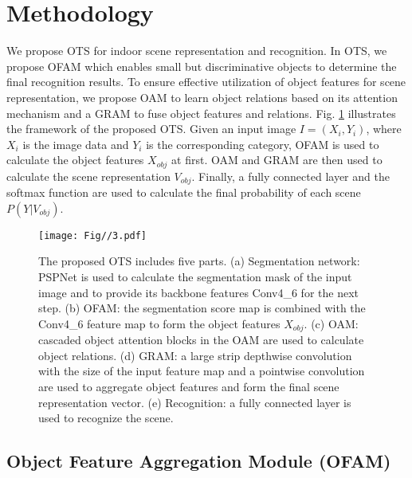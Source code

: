 \documentclass[letterpaper, 10 pt, conference]{ieeeconf}  %
\begin{document}
\vspace{-1mm}

\section{Methodology}
\label{Methodology}

We propose OTS for indoor scene representation and recognition. In OTS, we propose OFAM which enables small but discriminative objects to determine the final recognition results. To ensure effective utilization of object features for scene representation, we propose OAM to learn object relations based on its attention mechanism and a GRAM to fuse object features and relations. Fig. \ref{img3} illustrates the framework of the proposed OTS. Given an input image $I = (X_{i}, Y_{i})$, where $X_{i}$ is the image data and $Y_{i}$ is the corresponding category, OFAM is used to calculate the object features $X_{obj}$ at first. OAM and GRAM are then used to calculate the scene representation $V_{obj}$. Finally, a fully connected layer and the softmax function are used to calculate the final probability of each scene $P(Y|V_{obj})$.


\begin{figure}[t!]
    \centering
    \texttt{[image: Fig//3.pdf]}
    \caption{The proposed OTS includes five parts. (a) Segmentation network: PSPNet is used to calculate the segmentation mask of the input image and to provide its backbone features Conv4\_6 for the next step. (b) OFAM: the segmentation score map is combined with the Conv4\_6 feature map to form the object features $X_{obj}$. (c) OAM: cascaded object attention blocks in the OAM are used to calculate object relations. (d) GRAM: a large strip depthwise convolution with the size of the input feature map and a pointwise convolution are used to aggregate object features and form the final scene representation vector. (e) Recognition: a fully connected layer is used to recognize the scene.}
    \label{img3}
    \vspace{-4mm}
\end{figure}

\subsection{Object Feature Aggregation Module (OFAM)}
\label{OFAM}
\end{document}
